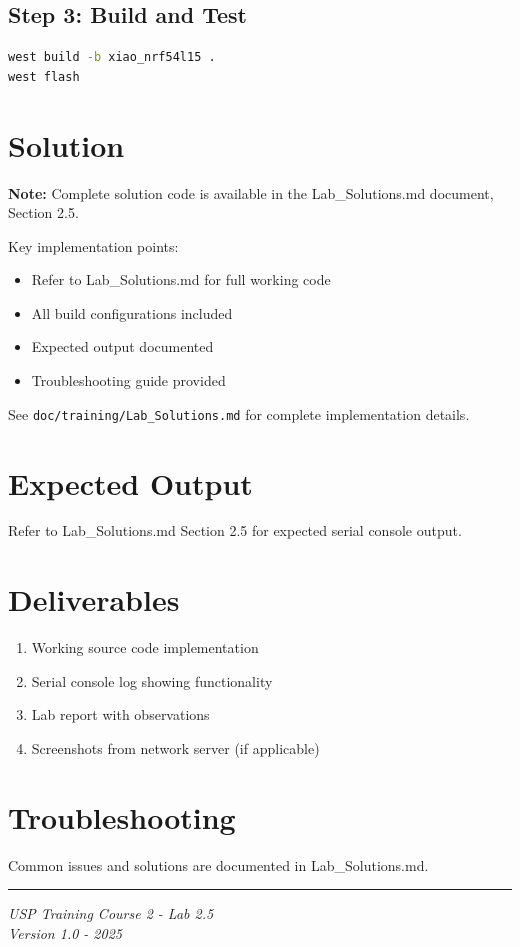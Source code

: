 \documentclass[11pt,a4paper]{article}
\begin{document}
\subsection{Step 3: Build and Test}
\begin{lstlisting}[language=bash]
west build -b xiao_nrf54l15 .
west flash
\end{lstlisting}

\section{Solution}

\begin{solutionbox}
\textbf{Note:} Complete solution code is available in the Lab\_Solutions.md document, Section 2.5.

Key implementation points:
\begin{itemize}
    \item Refer to Lab\_Solutions.md for full working code
    \item All build configurations included
    \item Expected output documented
    \item Troubleshooting guide provided
\end{itemize}

See \texttt{doc/training/Lab\_Solutions.md} for complete implementation details.
\end{solutionbox}

\section{Expected Output}

Refer to Lab\_Solutions.md Section 2.5 for expected serial console output.

\section{Deliverables}

\begin{enumerate}[itemsep=10pt]
    \item Working source code implementation
    \item Serial console log showing functionality
    \item Lab report with observations
    \item Screenshots from network server (if applicable)
\end{enumerate}

\section{Troubleshooting}

Common issues and solutions are documented in Lab\_Solutions.md.

\vfill
\noindent\rule{\textwidth}{0.4pt}
\begin{center}
\textit{USP Training Course 2 - Lab 2.5}\\
\textit{Version 1.0 - 2025}
\end{center}
\end{document}
